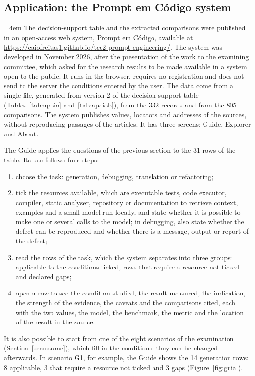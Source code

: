 \subsection{Application: the Prompt em Código system}\label{sec:aplicacao}
{\emergencystretch=4em
The decision-support table and the extracted comparisons were published in an open-access web system, Prompt em
Código, available at \url{https://caiofreitas1.github.io/tcc2-prompt-engineering/}. The system was developed in
November 2026, after the presentation of the work to the examining committee, which asked for the research
results to be made available in a system open to the public. It runs in the browser, requires no registration and does not send
to the server the conditions entered by the user. The data come from a single file, generated from version 2
of the decision-support table (Tables~\ref{tab:apoio} and~\ref{tab:apoiob}), from the 332 records and from the 805 comparisons. The system
publishes values, locators and addresses of the sources, without reproducing passages of the articles. It has three screens:
Guide, Explorer and About.\par}

The Guide applies the questions of the previous section to the 31 rows of the table. Its use follows four steps:
\begin{enumerate}
  \item choose the task: generation, debugging, translation or refactoring;
  \item tick the resources available, which are executable tests, code executor, compiler, static
  analyser, repository or documentation to retrieve context, examples and a small model run locally, and
  state whether it is possible to make one or several calls to the model; in debugging, also state whether the defect can
  be reproduced and whether there is a message, output or report of the defect;
  \item read the rows of the task, which the system separates into three groups: applicable to the conditions ticked, rows that
  require a resource not ticked and declared gaps;
  \item open a row to see the condition studied, the result measured, the indication, the strength of the evidence, the
  caveats and the comparisons cited, each with the two values, the model, the benchmark, the metric and the
  location of the result in the source.
\end{enumerate}
It is also possible to start from one of the eight scenarios of the examination (Section~\ref{sec:exame}), which fill in the conditions; they
can be changed afterwards. In scenario G1, for example, the Guide shows the 14 generation rows: 8 applicable, 3
that require a resource not ticked and 3 gaps (Figure~\ref{fig:guia}).

